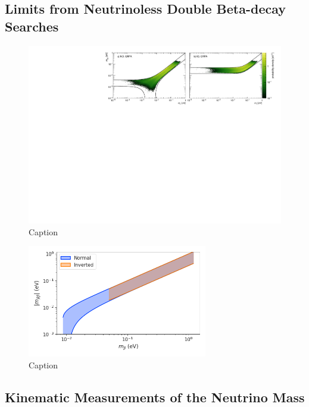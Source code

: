 \subsection{Limits from Neutrinoless Double Beta-decay Searches}

\begin{figure}[htbp]
    \centering
    \includegraphics[width=1.0\textwidth]{figs/Chapter-2/230228_nu_mass_0nbb.pdf}
    \caption{Caption}
    \label{fig:nu_mass_0nbb_posterior}
\end{figure}

\begin{figure}[htbp]
    \centering
    \includegraphics[width=0.7\textwidth]{figs/Chapter-2/230301_mbb_vs_mb.png}
    \caption{Caption}
    \label{fig:nu_mass_0nbb_vs_nu_beta}
\end{figure}

\subsection{Kinematic Measurements of the Neutrino Mass}

